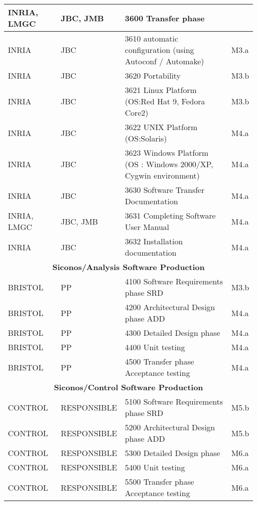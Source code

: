 \begin{longtable}{|l|l|l|l|}
  INRIA, LMGC & JBC, JMB &   3600 Transfer phase                        &  \\ \hline
  INRIA & JBC &   3610 automatic configuration (using Autoconf / Automake)     & M3.a \\ \hline
  INRIA & JBC &   3620 Portability                                              & M3.b \\ \hline
  INRIA & JBC &   3621 Linux Platform (OS:Red Hat 9, Fedora Core2) & M3.b \\ \hline
  INRIA & JBC &   3622 UNIX Platform (OS:Solaris)                       & M4.a \\ \hline
  INRIA & JBC &   3623 Windows Platform (OS : Windows 2000/XP, Cygwin environment)   & M4.a \\ \hline
  INRIA & JBC &   3630 Software Transfer Documentation          & M4.a \\ \hline
  INRIA, LMGC & JBC, JMB &   3631 Completing Software User Manual & M4.a \\ \hline
  INRIA & JBC &   3632 Installation documentation                       & M4.a \\ \hline
\multicolumn{4}{|c|}{\textbf{\scriptsize Siconos/Analysis Software Production}}
\\
\hline 
  BRISTOL & PP &   4100 Software Requirements phase SRD  & M3.b \\ \hline
  BRISTOL & PP &   4200 Architectural Design phase ADD & M4.a \\ \hline
  BRISTOL & PP &   4300 Detailed Design phase  & M4.a \\ \hline
  BRISTOL & PP &   4400 Unit testing & M4.a \\ \hline
  BRISTOL & PP &   4500 Transfer phase Acceptance testing & M4.a \\ \hline
\multicolumn{4}{|c|}{\textbf{\scriptsize Siconos/Control Software Production}}\\
\hline 
  CONTROL & RESPONSIBLE &   5100 Software Requirements phase SRD        & M5.b \\ \hline
  CONTROL & RESPONSIBLE &   5200 Architectural Design phase ADD         & M5.b \\ \hline
  CONTROL & RESPONSIBLE &   5300 Detailed Design phase                          & M6.a \\ \hline
  CONTROL & RESPONSIBLE &   5400 Unit testing                                           & M6.a \\ \hline
  CONTROL & RESPONSIBLE &   5500 Transfer phase Acceptance testing      & M6.a \\ \hline

\end{longtable}
